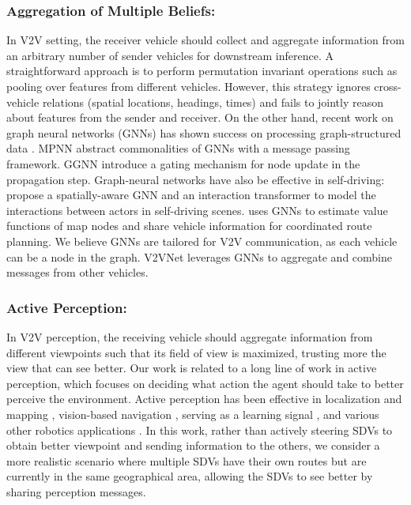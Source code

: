 \documentclass[runningheads]{llncs}
\begin{document}
\subsubsection{Aggregation of Multiple Beliefs:}
\label{sec:gnn_related}
 In V2V setting, the receiver vehicle should
collect and aggregate information from an arbitrary number of sender vehicles for downstream inference.
A straightforward approach is to perform permutation invariant operations such as pooling \cite{su2015multi, chen2017multi} over features from different vehicles. 
However, this strategy ignores cross-vehicle relations (spatial locations, headings, times)
and fails to jointly reason about features from the sender and receiver.
On the other hand, recent work on graph neural networks (GNNs) has shown 
success on processing graph-structured data \cite{duvenaud2015convolutional, hamilton2017inductive, li2017situation, yu2017spatio}.
MPNN \cite{gilmer2017neural} abstract commonalities of GNNs with a message passing framework.
GGNN \cite{li2015gated} introduce a gating mechanism for node update in the propagation step.
Graph-neural networks have also be effective in self-driving: 
\cite{casas2019spatially,li2020end} propose a spatially-aware GNN and an interaction transformer to model the interactions between actors in self-driving scenes. \cite{sykora2020multiagent} uses GNNs to estimate value functions of map nodes and share vehicle information for coordinated route planning.  
We believe GNNs are 
tailored for V2V communication, as each vehicle can be a node in the graph.
V2VNet leverages GNNs to aggregate and combine messages from other vehicles.

\subsubsection{Active Perception:}
\label{sec:active_perception}
  In V2V perception, the receiving vehicle should aggregate information from different viewpoints such that its field of view is maximized, trusting more the view that can see better. 
Our work is related to a long line of work in active perception, which focuses on deciding what action the agent should take to better perceive the environment. 
Active perception has been effective in localization and mapping \cite{davison2002simultaneous, kim2015active}, vision-based navigation \cite{davison1999mobile}, serving as a learning signal \cite{jayaraman2016look,yun2017action}, and various other robotics applications \cite{chen2011active}. 
In this work, rather than actively steering SDVs to obtain better viewpoint and sending information to the others, we consider a more realistic scenario where multiple SDVs have their own routes but are currently in the same geographical area, allowing the SDVs to see better by sharing perception messages.
\end{document}
